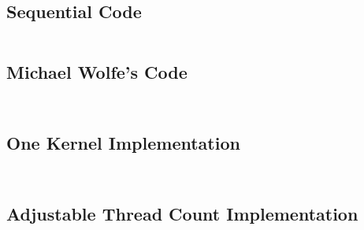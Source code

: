\documentclass[10pt]{article}
\begin{document}
\subsection{Sequential Code}
\inputminted[linenos, fontsize=\footnotesize]{c}{../jacobi_final/seq_jacobi.c}

\subsection{Michael Wolfe's Code}
\inputminted[linenos, fontsize=\footnotesize]{c}{../jacobi_final/original_jacobi5.cu}
\inputminted[linenos, fontsize=\footnotesize]{c}{../jacobi_final/original_jacobi6.cu}

\subsection{One Kernel Implementation}
\inputminted[linenos, fontsize=\footnotesize]{c}{../jacobi_final/1k_jacobi5.cu}
\inputminted[linenos, fontsize=\footnotesize]{c}{../jacobi_final/1k_jacobi6.cu}

\subsection{Adjustable Thread Count Implementation}
\inputminted[linenos, fontsize=\footnotesize]{c}{../jacobi_final/orig_J6M_v2.cu}
\inputminted[linenos, fontsize=\footnotesize]{c}{../jacobi_final/1k_J6M_v2.cu}
\end{document}
